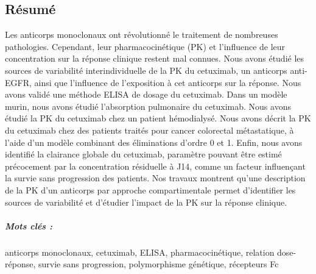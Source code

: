 ﻿\begin{vcenterpage}
\chapter*{Résumé}
Les anticorps monoclonaux ont révolutionné le traitement de nombreuses pathologies. Cependant, leur pharmacocinétique (PK) et l'influence de leur concentration sur la réponse clinique restent mal connues. Nous avons étudié les sources de variabilité interindividuelle de la PK du cetuximab, un anticorps anti-EGFR, ainsi que l'influence de l'exposition à cet anticorps sur la réponse. Nous avons validé une méthode ELISA de dosage du cetuximab. Dans un modèle murin, nous avons étudié l'absorption pulmonaire du cetuximab. Nous avons étudié la PK du cetuximab chez un patient hémodialysé. Nous avons décrit la PK du cetuximab chez des patients traités pour cancer colorectal métastatique, à l'aide d'un modèle combinant des éliminations d'ordre 0 et 1. Enfin, nous avons identifié la clairance globale du cetuximab, paramètre pouvant être estimé précocement par la concentration résiduelle à J14, comme un facteur influençant la survie sans progression des patients. Nos travaux montrent qu'une description de la PK d'un anticorps par approche compartimentale permet d'identifier les sources de variabilité et d'étudier l'impact de la PK sur la réponse clinique.
\paragraph*{Mots clés :} anticorps monoclonaux, cetuximab, ELISA, pharmacocinétique, relation dose-réponse, survie sans progression, polymorphisme génétique, récepteurs Fc
\end{vcenterpage}